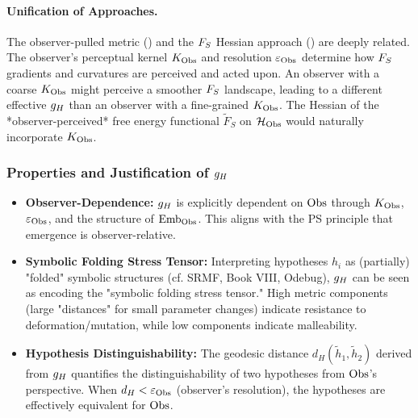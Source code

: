 \paragraph{Unification of Approaches.}
The observer-pulled metric () and the \(F_S\) Hessian approach () are deeply related. The observer's perceptual kernel \(K_{\mathrm{Obs}}\) and resolution \(\varepsilon_{\mathrm{Obs}}\) determine how \(F_S\) gradients and curvatures are perceived and acted upon. An observer with a coarse \(K_{\mathrm{Obs}}\) might perceive a smoother \(F_S\) landscape, leading to a different effective \(g_H\) than an observer with a fine-grained \(K_{\mathrm{Obs}}\). The Hessian of the *observer-perceived* free energy functional \(\tilde{F}_S\) on \(\mathcal{H}_{\mathrm{Obs}}\) would naturally incorporate \(K_{\mathrm{Obs}}\).
\subsubsection{Properties and Justification of \(g_H\)}
\label{subsec:bk8_properties_and_justification_of_observer_dependence}
\begin{itemize}
    \item \textbf{Observer-Dependence:} \(g_H\) is explicitly dependent on \(\mathrm{Obs}\) through \(K_{\mathrm{Obs}}\), \(\varepsilon_{\mathrm{Obs}}\), and the structure of \(\text{Emb}_{\mathrm{Obs}}\). This aligns with the PS principle that emergence is observer-relative.
    \item \textbf{Symbolic Folding Stress Tensor:} Interpreting hypotheses \(h_i\) as (partially) "folded" symbolic structures (cf. SRMF, Book VIII, Odebug), \(g_H\) can be seen as encoding the "symbolic folding stress tensor." High metric components (large "distances" for small parameter changes) indicate resistance to deformation/mutation, while low components indicate malleability.
    \item \textbf{Hypothesis Distinguishability:} The geodesic distance \(d_H(\tilde{h}_1, \tilde{h}_2)\) derived from \(g_H\) quantifies the distinguishability of two hypotheses from \(\mathrm{Obs}\)'s perspective. When \(d_H < \varepsilon_{\mathrm{Obs}}\) (observer's resolution), the hypotheses are effectively equivalent for \(\mathrm{Obs}\).
\end{itemize}
